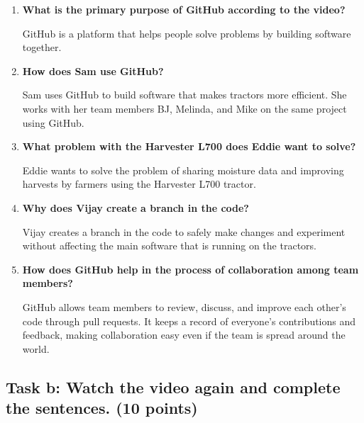 \documentclass[a4paper,12pt]{article}
\begin{document}
\begin{enumerate}
    \item \textbf{What is the primary purpose of GitHub according to the video?}
    
    GitHub is a platform that helps people solve problems by building software together.
    
    \item \textbf{How does Sam use GitHub?}
    
    Sam uses GitHub to build software that makes tractors more efficient. She works with her team members BJ, Melinda, and Mike on the same project using GitHub.
    
    \item \textbf{What problem with the Harvester L700 does Eddie want to solve?}
    
    Eddie wants to solve the problem of sharing moisture data and improving harvests by farmers using the Harvester L700 tractor.
    
    \item \textbf{Why does Vijay create a branch in the code?}
    
    Vijay creates a branch in the code to safely make changes and experiment without affecting the main software that is running on the tractors.
    
    \item \textbf{How does GitHub help in the process of collaboration among team members?}
    
    GitHub allows team members to review, discuss, and improve each other's code through pull requests. It keeps a record of everyone's contributions and feedback, making collaboration easy even if the team is spread around the world.
\end{enumerate}

\subsection{Task b: Watch the video again and complete the sentences. (10 points)}
\end{document}
